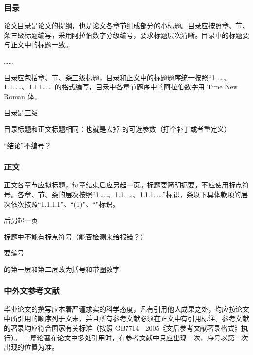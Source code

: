\subsubsection{目录}

\begin{reference}
  论文目录是论文的提纲，也是论文各章节组成部分的小标题。目录应按照章、节、条三级标题编写，采用阿拉伯数字分级编号，要求标题层次清晰。目录中的标题要与正文中的标题一致。

  ……

  目录应包括章、节、条三级标题，目录和正文中的标题题序统一按照“1……、 1.1……、1.1.1……”的格式编写，目录中各章节题序中的阿拉伯数字用 Time New Roman 体。
\end{reference}

\begin{points}
  \item 目录是三级
  \item 目录标题和正文标题相同：也就是去掉  的可选参数（打个补丁或者重定义）
  \item “结论”不编号？
\end{points}


\subsubsection{正文}

\begin{reference}
  正文各章节应拟标题，每章结束后应另起一页。标题要简明扼要，不应使用标点符号。各章、节、条的层次按照“1……、1.1……、1.1.1……”标识，条以下具体款项的层次依次按照“1.1.1.1”、“(1)”、“”标识。
\end{reference}

\begin{points}
  \item {} 后另起一页
  \item 标题中不能有标点符号（能否检测来给报错？）
  \item {} 要编号
  \item {} 的第一层和第二层改为括号和带圈数字
\end{points}


\subsubsection{中外文参考文献}

\begin{reference}
  毕业论文的撰写应本着严谨求实的科学态度，凡有引用他人成果之处，均应按论文中所引用的顺序列于文末，并且所有参考文献必须在正文中有引用标注。参考文献 的著录均应符合国家有关标准（按照 GB7714—2005《文后参考文献著录格式》执行）。 一篇论著在论文中多处引用时，在参考文献中只应出现一次，序号以第一次出现的位置为准。
\end{reference}

